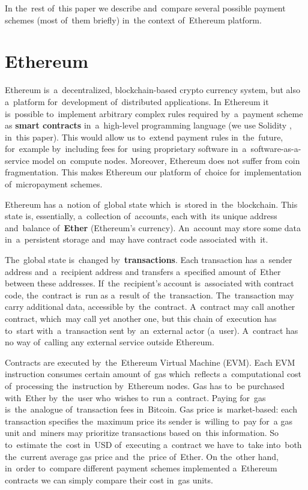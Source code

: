 \documentclass[a4paper]{article}
\begin{document}
    In the~rest of~this paper we describe and~compare several possible payment schemes (most of~them briefly) in~the
    context of~Ethereum platform.

\section{Ethereum}
\label{sec:ethereum}
    Ethereum \cite{ETHEREUM} is~a~decentralized, blockchain-based crypto currency system, but also a~platform
    for~development of~distributed applications. In Ethereum it is~possible to~implement arbitrary complex rules
    required by~a~payment scheme as \textbf{smart contracts} in~a~high-level programming language (we use Solidity
    \cite{SOLIDITY}, in~this paper).
    This would allow us to~extend payment rules in~the~future, for~example by~including fees for~using
    proprietary software in~a~software-as-a-service model on~compute nodes. Moreover, Ethereum does not suffer from
    coin fragmentation. This makes Ethereum our platform of~choice for~implementation of~micropayment schemes.

    Ethereum has a~notion of~global state which~is~stored in~the~blockchain. This state is, essentially, a~collection
    of~accounts, each with~its unique address and~balance of~\textbf{Ether} (Ethereum's currency). An~account may store some
    data in~a~persistent storage and~may have contract code associated with~it.

    The~global state is~changed by~\textbf{transactions}. Each transaction has a~sender address and~a~recipient address and
    transfers a~specified amount of~Ether between these addresses. If~the~recipient's account is~associated with
    contract code, the~contract is~run as a~result of~the~transaction. The~transaction may carry additional data,
    accessible by~the~contract. A~contract may call another contract, which~may call yet another one, but this chain
    of~execution has to~start with~a~transaction sent by~an~external actor (a~user). A~contract has no way of~calling
    any external service outside Ethereum.

    Contracts are executed by~the~Ethereum Virtual Machine (EVM)\cite{ETHERDEV}. Each EVM instruction consumes certain
    amount of~gas which~reflects a~computational cost of~processing the~instruction by~Ethereum nodes. Gas has to~be
    purchased with~Ether by~the~user who~wishes to~run a~contract. Paying for~gas is~the~analogue of~transaction fees
    in~Bitcoin. Gas price is~market-based: each transaction specifies the~maximum price its sender is~willing to~pay
    for~a gas unit and~miners may prioritize transactions based on~this information. So to~estimate the~cost in~USD
    of~executing a~contract we have to~take into~both the~current average gas price and~the~price of~Ether.
    On the~other hand, in~order to~compare different payment schemes implemented a~Ethereum contracts we can simply
    compare their cost in~gas units.
\end{document}
